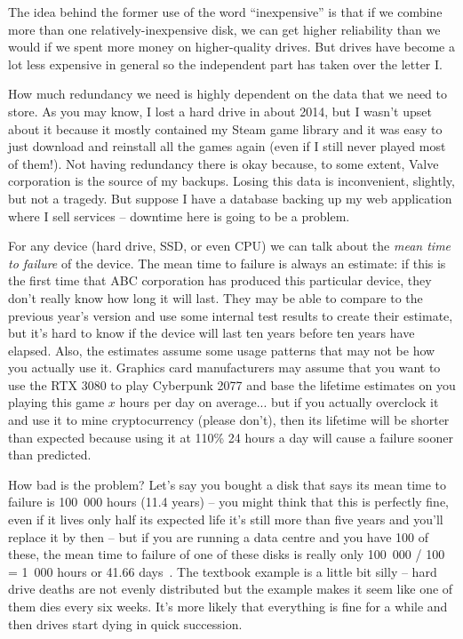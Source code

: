 The idea behind the former use of the word ``inexpensive'' is that if we combine more than one relatively-inexpensive disk, we can get higher reliability than we would if we spent more money on higher-quality drives. But drives have become a lot less expensive in general so the independent part has taken over the letter I. 

How much redundancy we need is highly dependent on the data that we need to store. As you may know, I lost a hard drive in about 2014, but I wasn't upset about it because it mostly contained my Steam game library and it was easy to just download and reinstall all the games again (even if I still never played most of them!). Not having redundancy there is okay because, to some extent, Valve corporation is the source of my backups. Losing this data is inconvenient, slightly, but not a tragedy. But suppose I have a database backing up my web application where I sell services -- downtime here is going to be a problem. 

For any device (hard drive, SSD, or even CPU) we can talk about the \textit{mean time to failure} of the device. The mean time to failure is always an estimate: if this is the first time that ABC corporation has produced this particular device, they don't really know how long it will last. They may be able to compare to the previous year's version and use some internal test results to create their estimate, but it's hard to know if the device will last ten years before ten years have elapsed. Also, the estimates assume some usage patterns that may not be how you actually use it. Graphics card manufacturers may assume that you want to use the RTX 3080 to play Cyberpunk 2077 and base the lifetime estimates on you playing this game $x$ hours per day on average... but if you actually overclock it and use it to mine cryptocurrency (please don't), then its lifetime will be shorter than expected because using it at 110\% 24 hours a day will cause a failure sooner than predicted.

How bad is the problem? Let's say you bought a disk that says its mean time to failure is 100~000 hours (11.4 years) -- you might think that this is perfectly fine, even if it lives only half its expected life it's still more than five years and you'll replace it by then -- but if you are running a data centre and you have 100 of these, the mean time to failure of one of these disks is really only 100~000 / 100 = 1~000 hours or 41.66 days~\cite{osc}. The textbook example is a little bit silly -- hard drive deaths are not evenly distributed but the example makes it seem like one of them dies every six weeks. It's more likely that everything is fine for a while and then drives start dying in quick succession. 

